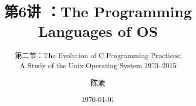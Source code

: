 


\title[第6讲]{第6讲 ：The Programming Languages of OS} %
\subtitle{第二节：The Evolution of C Programming Practices: \\
A Study of the Unix Operating System 1973–2015}
\author{陈渝} %
\date{\today} %




\begin{frame}
\titlepage %
\end{frame}

